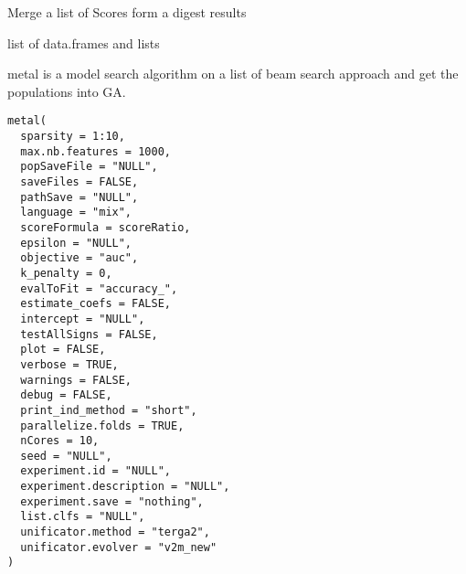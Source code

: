 \documentclass[a4paper]{book}
\begin{document}
%
\begin{Details}
Merge a list of Scores form a digest results
\end{Details}
%
\begin{Value}
list of data.frames and lists
\end{Value}
%
\begin{Description}
metal is a model search algorithm on a list of beam search approach and get the populations into GA.
\end{Description}
%
\begin{Usage}
\begin{verbatim}
metal(
  sparsity = 1:10,
  max.nb.features = 1000,
  popSaveFile = "NULL",
  saveFiles = FALSE,
  pathSave = "NULL",
  language = "mix",
  scoreFormula = scoreRatio,
  epsilon = "NULL",
  objective = "auc",
  k_penalty = 0,
  evalToFit = "accuracy_",
  estimate_coefs = FALSE,
  intercept = "NULL",
  testAllSigns = FALSE,
  plot = FALSE,
  verbose = TRUE,
  warnings = FALSE,
  debug = FALSE,
  print_ind_method = "short",
  parallelize.folds = TRUE,
  nCores = 10,
  seed = "NULL",
  experiment.id = "NULL",
  experiment.description = "NULL",
  experiment.save = "nothing",
  list.clfs = "NULL",
  unificator.method = "terga2",
  unificator.evolver = "v2m_new"
)
\end{verbatim}
\end{Usage}
%
\end{document}
